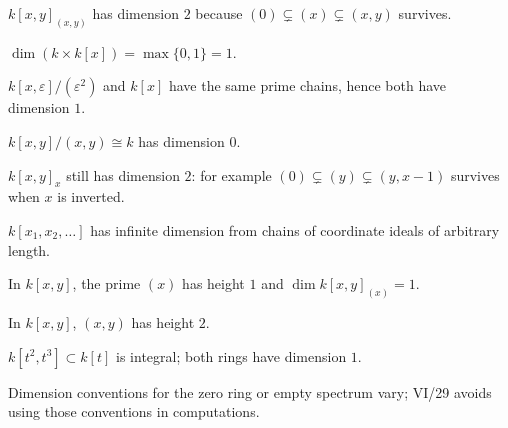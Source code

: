 \begin{example}\label{ex:vi29-11}
$k[x,y]_{(x,y)}$ has dimension $2$ because $(0)\subsetneq(x)\subsetneq(x,y)$ survives.
\end{example}

\begin{example}\label{ex:vi29-12}
$\dim(k\times k[x])=\max\{0,1\}=1$.
\end{example}

\begin{example}\label{ex:vi29-13}
$k[x,\varepsilon]/(\varepsilon^2)$ and $k[x]$ have the same prime chains, hence both have dimension $1$.
\end{example}

\begin{example}\label{ex:vi29-14}
$k[x,y]/(x,y)\cong k$ has dimension $0$.
\end{example}

\begin{example}\label{ex:vi29-15}
$k[x,y]_x$ still has dimension $2$: for example $(0)\subsetneq(y)\subsetneq(y,x-1)$ survives when $x$ is inverted.
\end{example}

\begin{example}\label{ex:vi29-16}
$k[x_1,x_2,\ldots]$ has infinite dimension from chains of coordinate ideals of arbitrary length.
\end{example}

\begin{example}\label{ex:vi29-17}
In $k[x,y]$, the prime $(x)$ has height $1$ and $\dim k[x,y]_{(x)}=1$.
\end{example}

\begin{example}\label{ex:vi29-18}
In $k[x,y]$, $(x,y)$ has height $2$.
\end{example}

\begin{example}\label{ex:vi29-19}
$k[t^2,t^3]\subset k[t]$ is integral; both rings have dimension $1$.
\end{example}

\begin{example}\label{ex:vi29-20}
Dimension conventions for the zero ring or empty spectrum vary; VI/29 avoids using those conventions in computations.
\end{example}
